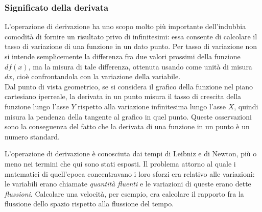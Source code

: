 \subsubsection{Significato della derivata}
L'operazione di derivazione ha uno scopo molto più importante 
dell'indubbia comodità di fornire un risultato privo di infinitesimi:
essa consente di calcolare il tasso di variazione di una funzione in un 
dato punto. Per tasso di variazione non si intende semplicemente la 
differenza
fra due valori prossimi della funzione $df(x)$, ma la misura di tale 
differenza, ottenuta usando come unità di misura $dx$, cioè confrontandola
con la variazione della variabile.\\
Dal punto di vista geometrico, se si considera il grafico della funzione 
nel 
piano cartesiano iperreale, la derivata in un punto misura il tasso di 
crescita
della funzione lungo l'asse $Y$ rispetto alla variazione infinitesima lungo 
l'asse $X$, quindi misura la pendenza della tangente al grafico in quel 
punto.
Queste osservazioni sono la conseguenza del fatto che la derivata di una 
funzione 
in un punto è un numero standard.

\begin{osservazione}
 L'operazione di derivazione è conosciuta dai tempi di Leibniz e di Newton, 
 più o meno nei termini che qui sono stati esposti. Il problema attorno al 
 quale i matematici di quell'epoca concentravano i loro sforzi era
 relativo alle variazioni: le variabili erano chiamate 
 \emph{quantità fluenti}  e le variazioni di queste erano dette 
 \emph{flussioni}.
 Calcolare una velocità, per esempio, era calcolare il rapporto
 fra la flussione dello spazio rispetto alla flussione del tempo.
\end{osservazione}

